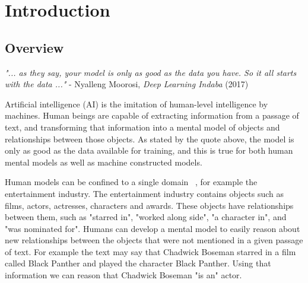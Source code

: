 
\chapter{Introduction}  %

\ifpdf
     \graphicspath{{Figs/Chapter1/}}
\else
    \graphicspath{{Chapter1/Figs/Vector/}{Chapter1/Figs/}}
\fi



\section{Overview} %

\emph{"... as they say, your model is only as good as the data you have. \newline So it all starts with the data ..."} \newline
\indent \indent - Nyalleng Moorosi, \emph{Deep Learning Indaba} (2017) \par

\smallskip

\noindent Artificial intelligence (AI) is the imitation of human-level intelligence by machines. Human beings are capable of extracting information from a passage of text, and transforming that information into a mental model of objects and relationships between those objects. As stated by the quote above, the model is only as good as the data available for training, and this is true for both human mental models as well as machine constructed models. \par

\noindent Human models can be confined to a single domain \unskip~\citep{staab2010handbook}, for example the entertainment industry. The entertainment industry contains objects such as films, actors, actresses, characters and awards. These objects have relationships between them, such as "starred in", "worked along side", "a character in", and "was nominated for". Humans can develop a mental model to easily reason about new relationships between the objects that were not mentioned in a given passage of text. For example the text may say that Chadwick Boseman starred in a film called Black Panther and played the character Black Panther. Using that information we can reason that Chadwick Boseman "is an" actor. \par


